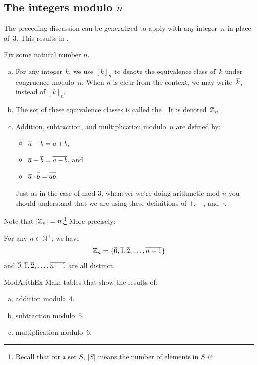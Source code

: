 \subsection{The integers modulo $n$}
The preceding discussion can be generalized to apply with any integer~$n$ in place of~$3$. This results in .

\begin{defn} \label{integ_mod_n}
Fix some natural number $n$.
\begin{enumerate}[(a)]
\item For any integer~$k$, we use $[k]_n$ to denote the equivalence class of~$k$ under congruence modulo~$n$. When $n$ is clear from the context, we may write~$\overline{k}$, instead of $[k]_n$.
\item The set of these equivalence classes is called the . It is denoted~$\mathbb{Z}_n$.

 \item Addition, subtraction, and multiplication modulo~$n$ are defined by:
\begin{itemize}
\item $\overline{a} \mathbin{+} \overline{b} = \overline{a + b}$,
\item $\overline{a} \mathbin{-} \overline{b} = \overline{a - b}$,
and
\item $\overline{a} \cdot \overline{b} = \overline{a  b}$.
\end{itemize}
Just as in the case of mod 3, whenever we're doing arithmetic mod $n$ you should understand that we are using these definitions of  $+$, $-$, and~$\cdot$.
\end{enumerate}
\end{defn}


Note that $\left|\mathbb{Z}_n \right| = n$.\footnote{Recall that for a set $S$, $|S|$ means the number of elements in $S$.} More precisely:

\begin{prop}{}
For any $n \in \mathbb{N}^+$, we have 
	$$\mathbb{Z}_n = \{ \overline{0}, \overline{1}, \overline{2}, \ldots, \overline{n-1} \}$$
and $\overline{0}, \overline{1}, \overline{2}, \ldots, \overline{n-1}$ are all distinct.
\end{prop}


\begin{exercise}{ModArithEx}  
Make tables that show the results of:
\begin{enumerate}[(a)]
\item \label{ModArithEx-tables-addition} 
addition modulo~$4$.
\item \label{ModArithEx-tables-subtraction} 
subtraction modulo~$5$.
\item \label{ModArithEx-tables-multiplication} 
multiplication modulo~$6$.
\end{enumerate}
\end{exercise}


